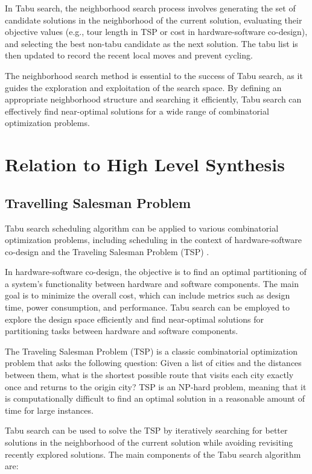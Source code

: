 \documentclass[conference]{IEEEtran}
\begin{document}
In Tabu search, the neighborhood search process involves generating the set of candidate solutions in the neighborhood of the current solution, evaluating their objective values (e.g., tour length in TSP or cost in hardware-software co-design), and selecting the best non-tabu candidate as the next solution. The tabu list is then updated to record the recent local moves and prevent cycling.

The neighborhood search method is essential to the success of Tabu search, as it guides the exploration and exploitation of the search space. By defining an appropriate neighborhood structure and searching it efficiently, Tabu search can effectively find near-optimal solutions for a wide range of combinatorial optimization problems.


\section{Relation to High Level Synthesis}

\subsection{Travelling Salesman Problem}

Tabu search scheduling algorithm can be applied to various combinatorial optimization problems, including scheduling in the context of hardware-software co-design and the Traveling Salesman Problem (TSP) \cite{pham2000intelligent}.

In hardware-software co-design, the objective is to find an optimal partitioning of a system's functionality between hardware and software components. The main goal is to minimize the overall cost, which can include metrics such as design time, power consumption, and performance. Tabu search can be employed to explore the design space efficiently and find near-optimal solutions for partitioning tasks between hardware and software components.

The Traveling Salesman Problem (TSP) is a classic combinatorial optimization problem that asks the following question: Given a list of cities and the distances between them, what is the shortest possible route that visits each city exactly once and returns to the origin city? TSP is an NP-hard problem, meaning that it is computationally difficult to find an optimal solution in a reasonable amount of time for large instances.

Tabu search can be used to solve the TSP by iteratively searching for better solutions in the neighborhood of the current solution while avoiding revisiting recently explored solutions. The main components of the Tabu search algorithm are:
\end{document}
